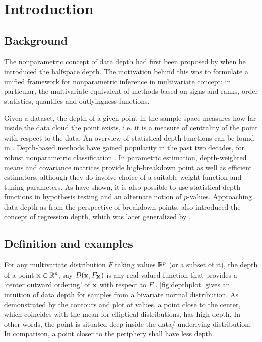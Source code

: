\chapter{Introduction}
\label{chapter:chapter-intro}

\section{Background}

The nonparametric concept of data depth had first been proposed by \cite{tukey75} when he introduced the halfspace depth. The motivation behind this was to formulate a unified framework for nonparametric inference in multivariate concept: in particular, the multivariate equivalent of methods based on signs and ranks, order statistics, quantiles and outlyingness functions. 

Given a dataset, the depth of a given point in the sample space measures how far inside the data cloud the point exists, i.e. it is a measure of centrality of the point with respect to the data. An overview of statistical depth functions can be found in \cite{zuo00}. Depth-based methods have gained popularity in the past two decades, for robust nonparametric classification \citep{jornsten04, ghosh05, dutta12, sguera14}. In parametric estimation, depth-weighted means \citep{ZuoCuiHe04} and covariance matrices \citep{ZuoCui05} provide high-breakdown point as well as efficient estimators, although they do involve choice of a suitable weight function and tuning parameters. As \cite{LiuSingh97} have shown, it is also possible to use statistical depth functions in hypothesis testing and an alternate notion of $p$-values. Approaching data depth as from the perspective of breakdown points, \cite{RousseeuwHubert99} also introduced the concept of regression depth, which was later generalized by \cite{Mizera02}.

\section{Definition and examples}
For any multivariate distribution $F$ taking values $\tilde {{\mathbb{R}}}^p$ (or a subset of it), the depth of a point ${\bf{x}} \in \mathbb{R}^p$, say $D({\bf{x}}, F_{\mathbf{X}})$ is any real-valued function that provides a `center outward ordering' of ${\bf{x}}$ with respect to $F$ \citep{zuo00}. \ref{fig:depthplot} gives an intuition of data depth for samples from a bivariate normal distribution. As demonstrated by the contours and plot of values, a point close to the center, which coincides with the mean for elliptical distributions, has high depth. In other words, the point is situated deep inside the data/ underlying distribution. In comparison, a point closer to the periphery shall have less depth.

